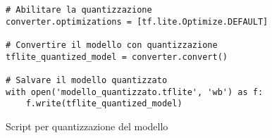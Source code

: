 \begin{code}
\begin{verbatim}
# Abilitare la quantizzazione
converter.optimizations = [tf.lite.Optimize.DEFAULT]

# Convertire il modello con quantizzazione
tflite_quantized_model = converter.convert()

# Salvare il modello quantizzato
with open('modello_quantizzato.tflite', 'wb') as f:
    f.write(tflite_quantized_model)
\end{verbatim}
\caption{Script per quantizzazione del modello}
\label{code:2}
\end{code}


   

